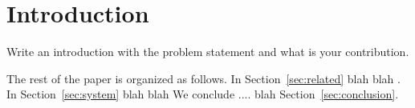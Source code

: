 


\section{Introduction}\label{sec:introduction}

Write an introduction with the problem statement 
and what is your contribution.



The rest of the paper is organized as follows.  In Section~\ref{sec:related} 
blah blah .  In Section~\ref{sec:system} blah blah We conclude  .... blah 
Section~\ref{sec:conclusion}.




